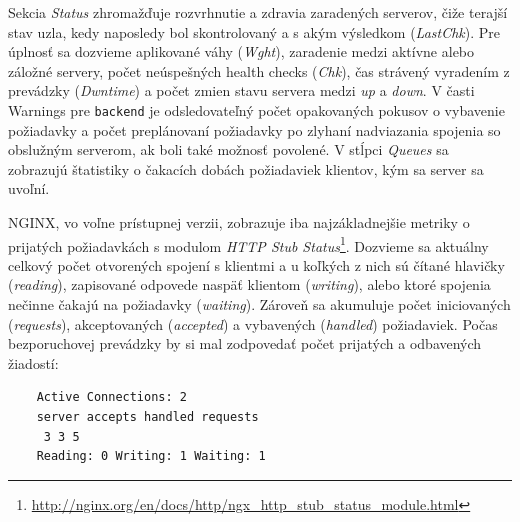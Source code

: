 \documentclass[12pt, a4paper]{article}
\begin{document}
Sekcia \emph{Status} zhromažďuje rozvrhnutie a zdravia zaradených serverov, čiže terajší stav uzla, kedy 
naposledy bol skontrolovaný a s akým výsledkom (\emph{LastChk}). Pre úplnosť sa dozvieme aplikované váhy 
(\emph{Wght}), zaradenie medzi aktívne alebo záložné servery, počet neúspešných health checks (\emph{Chk}), 
čas strávený vyradením z prevádzky (\emph{Dwntime}) a počet zmien stavu servera medzi \emph{up} a 
\emph{down}. V časti Warnings pre \verb|backend| je odsledovateľný počet opakovaných pokusov o vybavenie 
požiadavky a počet preplánovaní požiadavky po zlyhaní nadviazania spojenia so obslužným serverom, 
ak boli také možnosť povolené. V stĺpci \emph{Queues} sa zobrazujú štatistiky o čakacích dobách požiadaviek 
klientov, kým sa server sa uvoľní.

NGINX, vo voľne prístupnej verzii, zobrazuje iba najzákladnejšie metriky o prijatých
požiadavkách s modulom \emph{HTTP Stub Status}\footnote{
\url{http://nginx.org/en/docs/http/ngx_http_stub_status_module.html}}. Dozvieme sa 
aktuálny celkový počet otvorených spojení s klientmi a u koľkých z nich sú čítané hlavičky (\emph{reading}), 
zapisované odpovede naspäť klientom (\emph{writing}), alebo ktoré spojenia nečinne čakajú na 
požiadavky (\emph{waiting}). Zároveň sa akumuluje počet iniciovaných (\emph{requests}), akceptovaných 
(\emph{accepted}) a vybavených (\emph{handled}) požiadaviek. Počas bezporuchovej prevádzky by si mal 
zodpovedať počet prijatých a odbavených žiadostí:

\begin{lstlisting}
	Active Connections: 2
	server accepts handled requests
 	 3 3 5
	Reading: 0 Writing: 1 Waiting: 1
\end{lstlisting}
\end{document}
